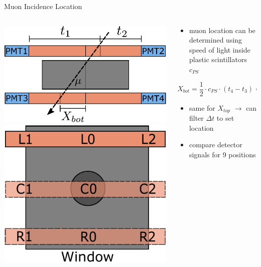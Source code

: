 \documentclass[aspectratio=169]{beamer}
\begin{document}
	\begin{frame}{Muon Incidence Location}
		\begin{columns}
			\begin{column}{.5\textwidth}
				\centering
				\includegraphics[width=.7\textwidth]{pictures/positional.pdf}
				\includegraphics[width=.5\textwidth]{pictures/locations_cosmics.pdf}
			\end{column}
		
		
			\begin{column}{.5\textwidth}
				\begin{itemize}
					\item muon location can be determined using speed of light inside plastic scintillators $c_{PS}$
				\end{itemize}
			\begin{equation*}
				X_{bot} =  \frac{1}{2} \cdot c_{PS} \cdot (t_4 - t_3) = \frac{1}{2} \cdot c_{PS} \cdot \Delta t_{43}
			\end{equation*}
		
			\begin{itemize}
				\item same for $X_{top}$ $\rightarrow$ can filter $\Delta t$ to set location
				\item compare detector signals for 9 positions
			\end{itemize}
		
		
			\end{column}
		\end{columns}

	\end{frame}
\end{document}
